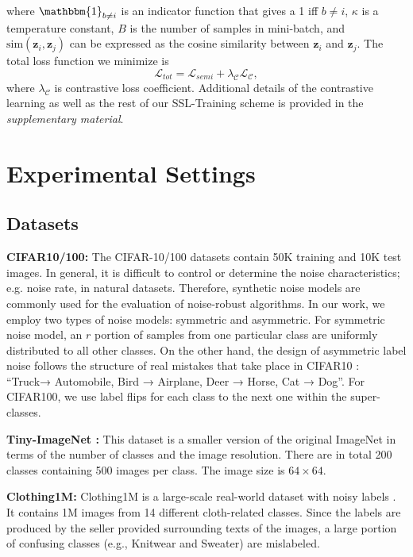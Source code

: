 \documentclass[10pt,twocolumn,letterpaper]{article}
\begin{document}
where $\mathbbm{1}_{b \neq i}$ is an indicator function that gives a 1 iff $b \neq i$, $\kappa$ is a temperature constant, $B$ is the number of samples in mini-batch, and $\mathrm{sim}(\mathbf{z}_{i}, \mathbf{z}_{j})$ can be expressed as the cosine similarity between $\mathbf{z}_{i}$ and $\mathbf{z}_{j}$. The total loss function we minimize is
\begin{equation} \label{eq:main_loss}
    \mathcal{L}_{tot} = \mathcal{L}_{semi} + \lambda_{\mathcal{C}} \mathcal{L}_\mathcal{C},
\end{equation}
where $\lambda_{\mathcal{C}}$ is contrastive loss coefficient. Additional details of the contrastive learning as well as the rest of our SSL-Training scheme is provided in the {\em supplementary material}.
  


\section{Experimental Settings}
\subsection{Datasets}
\textbf{CIFAR10/100:} The CIFAR-10/100 datasets \cite{krizhevsky2009learning} contain 50K training and 10K test images.
In general, it is difficult to control or determine the noise characteristics; e.g. noise rate, in natural datasets. Therefore, synthetic noise models are commonly used for the evaluation of noise-robust algorithms. In our work, we employ two types of noise models: symmetric and asymmetric. For symmetric noise model, an $r$ portion of samples from one particular class are uniformly distributed to all other classes.
On the other hand, the design of asymmetric label noise follows the structure of real mistakes that take place in CIFAR10 \cite{li2019learning}: “Truck→ Automobile, Bird → Airplane, Deer → Horse, Cat → Dog”.  For CIFAR100, we use label flips for each class to the next one within the super-classes.  



\textbf{Tiny-ImageNet \cite{le2015tiny}:} This dataset is a smaller version of the original ImageNet in terms of the number of classes and the image resolution. There are in total 200 classes containing 500 images per class. The image size is $64 \times 64$. 


\textbf{Clothing1M:} Clothing1M is a large-scale
real-world dataset with noisy labels \cite{xiao2015learning}. It contains 1M images from 14 different cloth-related classes.
Since the labels are produced by the seller provided surrounding texts of the images, a large portion of confusing classes (e.g., Knitwear and Sweater) are mislabeled. 
\end{document}
